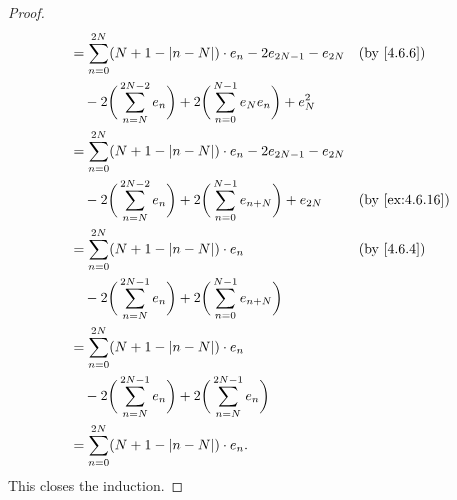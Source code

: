 \begin{proof}
\begin{align*}
     & = \sum_{n = 0}^{2N} (N + 1 - \abs{n - N}) \cdot e_n - 2 e_{2N - 1} - e_{2N}                                       &  & \by{4.6.6}                 \\
     & \quad - 2 \bigg(\sum_{n = N}^{2N - 2} e_n\bigg) + 2 \bigg(\sum_{n = 0}^{N - 1} e_N e_n\bigg) + e_N^2                                              \\
     & = \sum_{n = 0}^{2N} (N + 1 - \abs{n - N}) \cdot e_n - 2 e_{2N - 1} - e_{2N}                                                                       \\
     & \quad - 2 \bigg(\sum_{n = N}^{2N - 2} e_n\bigg) + 2 \bigg(\sum_{n = 0}^{N - 1} e_{n + N}\bigg) + e_{2N}           &  & \by{ex:4.6.16}             \\
     & = \sum_{n = 0}^{2N} (N + 1 - \abs{n - N}) \cdot e_n                                                               &  & \by{4.6.4}                 \\
     & \quad - 2 \bigg(\sum_{n = N}^{2N - 1} e_n\bigg) + 2 \bigg(\sum_{n = 0}^{N - 1} e_{n + N}\bigg)                                                    \\
     & = \sum_{n = 0}^{2N} (N + 1 - \abs{n - N}) \cdot e_n                                                                                               \\
     & \quad - 2 \bigg(\sum_{n = N}^{2N - 1} e_n\bigg) + 2 \bigg(\sum_{n = N}^{2N - 1} e_n\bigg)                                                         \\
     & = \sum_{n = 0}^{2N} (N + 1 - \abs{n - N}) \cdot e_n.
  \end{align*}
  This closes the induction.


\end{proof}
